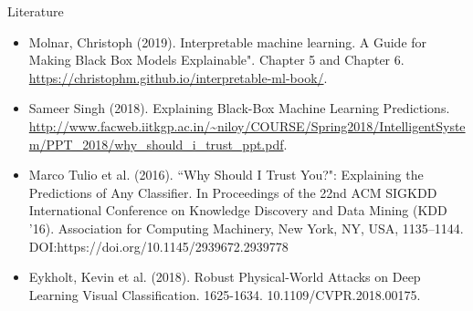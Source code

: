 \documentclass[11pt,compress,t,notes=noshow, xcolor=table]{beamer}
\begin{document}
\begin{vbframe}{Literature}
	\begin{itemize}
		\small
		\item Molnar, Christoph (2019). Interpretable machine learning. A Guide for Making Black Box Models Explainable". Chapter 5 and Chapter 6. \url{https://christophm.github.io/interpretable-ml-book/}.
		\item Sameer Singh (2018). Explaining Black-Box Machine Learning Predictions.  \url{http://www.facweb.iitkgp.ac.in/~niloy/COURSE/Spring2018/IntelligentSystem/PPT_2018/why_should_i_trust_ppt.pdf}. 
		\item Marco Tulio et al. (2016). ``Why Should I Trust You?": Explaining the Predictions of Any Classifier. In Proceedings of the 22nd ACM SIGKDD International Conference on Knowledge Discovery and Data Mining (KDD '16). Association for Computing Machinery, New York, NY, USA, 1135–1144. DOI:https://doi.org/10.1145/2939672.2939778
		\item Eykholt, Kevin et al. (2018). Robust Physical-World Attacks on Deep Learning Visual Classification. 1625-1634. 10.1109/CVPR.2018.00175. 
	\end{itemize}
\end{vbframe}

\endlecture
\end{document}
